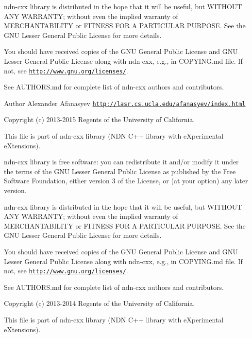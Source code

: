 ndn-\/cxx library is distributed in the hope that it will be useful, but W\+I\+T\+H\+O\+UT A\+NY W\+A\+R\+R\+A\+N\+TY; without even the implied warranty of M\+E\+R\+C\+H\+A\+N\+T\+A\+B\+I\+L\+I\+TY or F\+I\+T\+N\+E\+SS F\+OR A P\+A\+R\+T\+I\+C\+U\+L\+AR P\+U\+R\+P\+O\+SE. See the G\+NU Lesser General Public License for more details.

You should have received copies of the G\+NU General Public License and G\+NU Lesser General Public License along with ndn-\/cxx, e.\+g., in C\+O\+P\+Y\+I\+N\+G.\+md file. If not, see \href{http://www.gnu.org/licenses/}{\tt http\+://www.\+gnu.\+org/licenses/}.

See A\+U\+T\+H\+O\+R\+S.\+md for complete list of ndn-\/cxx authors and contributors.

\begin{DoxyAuthor}{Author}
Alexander Afanasyev \href{http://lasr.cs.ucla.edu/afanasyev/index.html}{\tt http\+://lasr.\+cs.\+ucla.\+edu/afanasyev/index.\+html}
\end{DoxyAuthor}
Copyright (c) 2013-\/2015 Regents of the University of California.

This file is part of ndn-\/cxx library (N\+DN C++ library with e\+Xperimental e\+Xtensions).

ndn-\/cxx library is free software\+: you can redistribute it and/or modify it under the terms of the G\+NU Lesser General Public License as published by the Free Software Foundation, either version 3 of the License, or (at your option) any later version.

ndn-\/cxx library is distributed in the hope that it will be useful, but W\+I\+T\+H\+O\+UT A\+NY W\+A\+R\+R\+A\+N\+TY; without even the implied warranty of M\+E\+R\+C\+H\+A\+N\+T\+A\+B\+I\+L\+I\+TY or F\+I\+T\+N\+E\+SS F\+OR A P\+A\+R\+T\+I\+C\+U\+L\+AR P\+U\+R\+P\+O\+SE. See the G\+NU Lesser General Public License for more details.

You should have received copies of the G\+NU General Public License and G\+NU Lesser General Public License along with ndn-\/cxx, e.\+g., in C\+O\+P\+Y\+I\+N\+G.\+md file. If not, see \href{http://www.gnu.org/licenses/}{\tt http\+://www.\+gnu.\+org/licenses/}.

See A\+U\+T\+H\+O\+R\+S.\+md for complete list of ndn-\/cxx authors and contributors.

Copyright (c) 2013-\/2014 Regents of the University of California.

This file is part of ndn-\/cxx library (N\+DN C++ library with e\+Xperimental e\+Xtensions).


